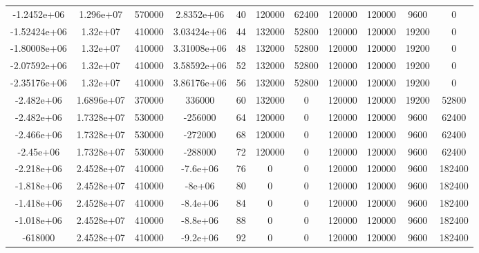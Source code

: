 \documentclass[twocolumn]{article}
\begin{document}
\begin{landscape}
\begin{table}[H]
\begin{tabular}{ccccccccccc}
-1.2452e+06  & 1.296e+07        & 570000            & 2.8352e+06              & 40       & 120000 & 62400 & 120000  & 120000 & 9600  & 0            \\
-1.52424e+06 & 1.32e+07         & 410000            & 3.03424e+06             & 44       & 132000 & 52800 & 120000  & 120000 & 19200 & 0            \\
-1.80008e+06 & 1.32e+07         & 410000            & 3.31008e+06             & 48       & 132000 & 52800 & 120000  & 120000 & 19200 & 0            \\
-2.07592e+06 & 1.32e+07         & 410000            & 3.58592e+06             & 52       & 132000 & 52800 & 120000  & 120000 & 19200 & 0            \\
-2.35176e+06 & 1.32e+07         & 410000            & 3.86176e+06             & 56       & 132000 & 52800 & 120000  & 120000 & 19200 & 0            \\
-2.482e+06   & 1.6896e+07       & 370000            & 336000                  & 60       & 132000 & 0     & 120000  & 120000 & 19200 & 52800        \\
-2.482e+06   & 1.7328e+07       & 530000            & -256000                 & 64       & 120000 & 0     & 120000  & 120000 & 9600  & 62400        \\
-2.466e+06   & 1.7328e+07       & 530000            & -272000                 & 68       & 120000 & 0     & 120000  & 120000 & 9600  & 62400        \\
-2.45e+06    & 1.7328e+07       & 530000            & -288000                 & 72       & 120000 & 0     & 120000  & 120000 & 9600  & 62400        \\
-2.218e+06   & 2.4528e+07       & 410000            & -7.6e+06                & 76       & 0      & 0     & 120000  & 120000 & 9600  & 182400       \\
-1.818e+06   & 2.4528e+07       & 410000            & -8e+06                  & 80       & 0      & 0     & 120000  & 120000 & 9600  & 182400       \\
-1.418e+06   & 2.4528e+07       & 410000            & -8.4e+06                & 84       & 0      & 0     & 120000  & 120000 & 9600  & 182400       \\
-1.018e+06   & 2.4528e+07       & 410000            & -8.8e+06                & 88       & 0      & 0     & 120000  & 120000 & 9600  & 182400       \\
-618000      & 2.4528e+07       & 410000            & -9.2e+06                & 92       & 0      & 0     & 120000  & 120000 & 9600  & 182400       \\

\end{tabular}
\end{table}
\end{landscape}
\end{document}
